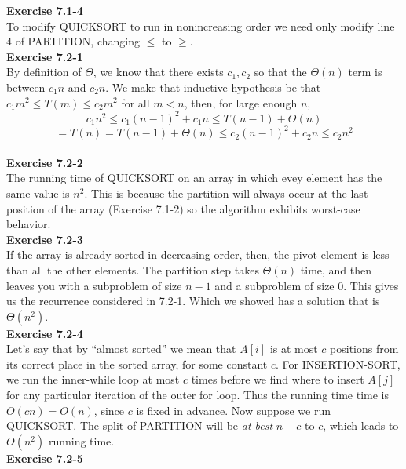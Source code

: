 \documentclass{article}
\begin{document}
\noindent\textbf{Exercise 7.1-4}\\

To modify QUICKSORT to run in nonincreasing order we need only modify line 4 of PARTITION, changing $\leq$ to $\geq$. \\

\noindent\textbf{Exercise 7.2-1}\\

By definition of $\Theta$, we know that there exists $c_1,c_2$ so that the $\Theta(n)$ term is between $c_1 n$ and $c_2 n$. We make that inductive hypothesis be that $c_1 m^2 \le T(m) \le c_2 m^2$ for all $m < n$, then, for large enough $n$, 
\[c_1 n^2 \le c_1 (n-1)^2 + c_1 n \le T(n-1) + \Theta(n)\] \[= T(n) = T(n-1) + \Theta(n) \le c_2 (n-1)^2 +c_2 n \le c_2 n^2\]\\


\noindent\textbf{Exercise 7.2-2}\\

The running time of QUICKSORT on an array in which evey element has the same value is $n^2$.  This is because the partition will always occur at the last position of the array (Exercise 7.1-2) so the algorithm exhibits worst-case behavior. \\

\noindent\textbf{Exercise 7.2-3}\\

If the array is already sorted in decreasing order, then, the pivot element is less than all the other elements. The partition step takes $\Theta(n)$ time, and then leaves you with a subproblem of size $n-1$ and a subproblem of size 0. This gives us the recurrence considered in 7.2-1. Which we showed has a solution that is $\Theta(n^2)$.\\

\noindent\textbf{Exercise 7.2-4}\\

Let's say that by ``almost sorted'' we mean that $A[i]$ is at most $c$ positions from its correct place in the sorted array, for some constant $c$. For INSERTION-SORT, we run the inner-while loop at most $c$ times before we find where to insert $A[j]$ for any particular iteration of the outer for loop.  Thus the running time time is $O(cn) = O(n)$, since $c$ is fixed in advance.  Now suppose we run QUICKSORT.  The split of PARTITION will be \emph{at best} $n-c$ to $c$, which leads to $O(n^2)$ running time. \\

\noindent\textbf{Exercise 7.2-5}\\
\end{document}
